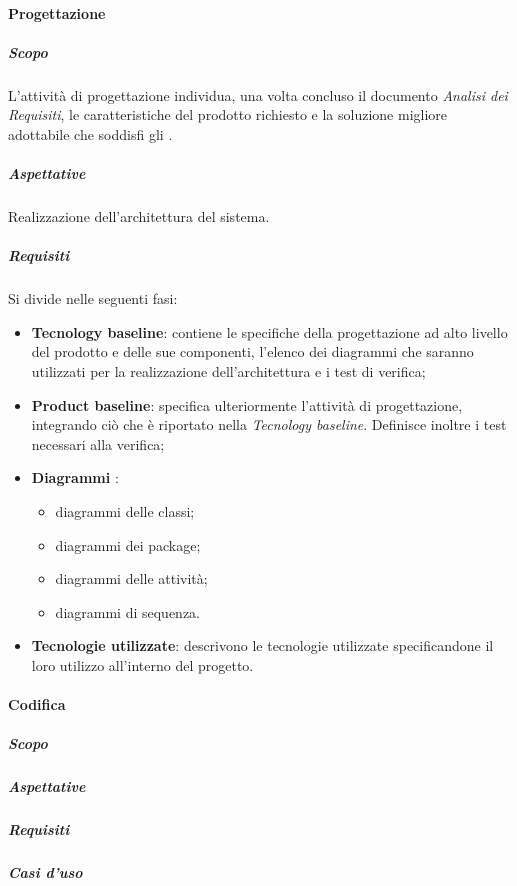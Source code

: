 			\paragraph{Progettazione}	
				\subparagraph{Scopo}
				L'attività di progettazione individua, una volta concluso il documento \textit{Analisi dei Requisiti}, le caratteristiche del prodotto richiesto e la soluzione migliore adottabile che soddisfi gli . 
				\subparagraph{Aspettative}
				Realizzazione dell'architettura del sistema.
				\subparagraph{Requisiti}
				Si divide nelle seguenti fasi:
				\begin{itemize}
					\item \textbf{Tecnology baseline}: contiene le specifiche della progettazione ad alto livello del prodotto e delle sue componenti, l'elenco dei diagrammi  che saranno utilizzati per la realizzazione dell'architettura e i test di verifica;
					\item \textbf{Product baseline}: specifica ulteriormente l'attività di progettazione, integrando ciò che è riportato nella \textit{Tecnology baseline}. Definisce inoltre i test necessari alla verifica;
					\item \textbf{Diagrammi }:
					\begin{itemize}
						\item diagrammi delle classi;
						\item diagrammi dei package;
						\item diagrammi delle attività;
						\item diagrammi di sequenza.
					\end{itemize}
					\item \textbf{Tecnologie utilizzate}: descrivono le tecnologie utilizzate specificandone il loro utilizzo all'interno del progetto.
				\end{itemize}			
			\paragraph{Codifica}	
				\subparagraph{Scopo}
				\subparagraph{Aspettative}
				\subparagraph{Requisiti}
				\subparagraph{Casi d'uso}
		 